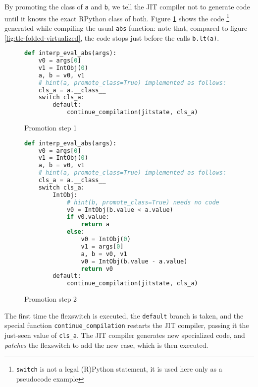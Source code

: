 By promoting the class of \lstinline{a} and \lstinline{b}, we tell the JIT
compiler not to generate code until it knows the exact RPython class of both.
Figure \ref{fig:tlc-abs-promotion-1} shows the
code \footnote{\lstinline{switch} is not a legal (R)Python statement, it is
  used here only as a pseudocode example} generated while compiling the usual
\lstinline{abs} function: note that, compared to figure
\ref{fig:tlc-folded-virtualized}, the code stops just before the calls
\lstinline{b.lt(a)}.

\begin{figure}[h]
\begin{center}
\begin{lstlisting}[language=Python]
def interp_eval_abs(args):
    v0 = args[0]
    v1 = IntObj(0)
    a, b = v0, v1
    # hint(a, promote_class=True) implemented as follows:
    cls_a = a.__class__
    switch cls_a:
        default: 
            continue_compilation(jitstate, cls_a)
\end{lstlisting}
\caption{Promotion step 1}
\label{fig:tlc-abs-promotion-1}
\end{center}
\end{figure}

\begin{figure}[h]
\begin{center}
\begin{lstlisting}[language=Python]
def interp_eval_abs(args):
    v0 = args[0]
    v1 = IntObj(0)
    a, b = v0, v1
    # hint(a, promote_class=True) implemented as follows:
    cls_a = a.__class__
    switch cls_a:
        IntObj:
            # hint(b, promote_class=True) needs no code
            v0 = IntObj(b.value < a.value)
            if v0.value:
                return a
            else:
                v0 = IntObj(0)
                v1 = args[0]
                a, b = v0, v1
                v0 = IntObj(b.value - a.value)
                return v0
        default: 
            continue_compilation(jitstate, cls_a)
\end{lstlisting}
\caption{Promotion step 2}
\label{fig:tlc-abs-promotion-2}
\end{center}
\end{figure}

The first time the flexswitch is executed, the \lstinline{default} branch is
taken, and the special function \lstinline{continue_compilation} restarts the
JIT compiler, passing it the just-seen value of \lstinline{cls_a}.  The JIT
compiler generates new specialized code, and \emph{patches} the flexswitch to
add the new case, which is then executed.

